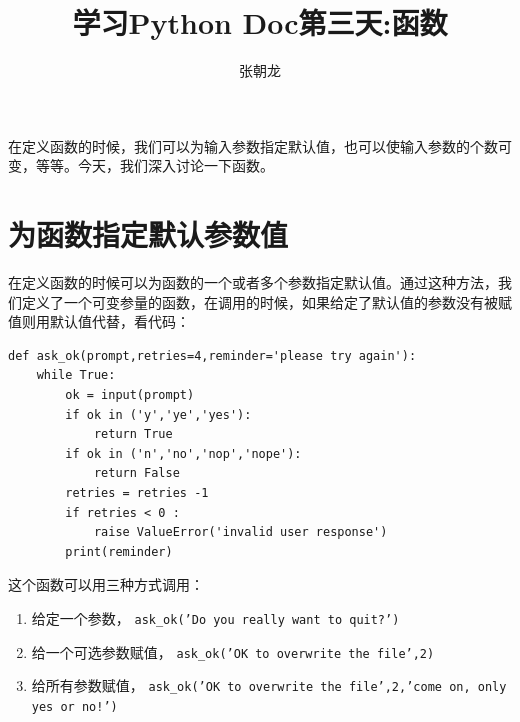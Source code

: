 \documentclass[10pt,a4paper,UTF8]{article}
\author{张朝龙}
\date{}
\title{学习Python Doc第三天:函数}
\begin{document}
\maketitle
\tableofcontents
{}
\newpage

在定义函数的时候，我们可以为输入参数指定默认值，也可以使输入参数的个数可变，等等。今天，我们深入讨论一下函数。

\section{为函数指定默认参数值}
\label{sec:org65cf5f8}


在定义函数的时候可以为函数的一个或者多个参数指定默认值。通过这种方法，我们定义了一个可变参量的函数，在调用的时候，如果给定了默认值的参数没有被赋值则用默认值代替，看代码：
\lstset{language=Python,label= ,caption= ,captionpos=b,firstnumber=1,numbers=left}
\begin{lstlisting}
def ask_ok(prompt,retries=4,reminder='please try again'):
    while True:
        ok = input(prompt)
        if ok in ('y','ye','yes'):
            return True
        if ok in ('n','no','nop','nope'):
            return False
        retries = retries -1
        if retries < 0 :
            raise ValueError('invalid user response')
        print(reminder)
\end{lstlisting}

这个函数可以用三种方式调用：
\begin{enumerate}
\item 给定一个参数， \texttt{ask\_ok('Do you really want to quit?')}
\item 给一个可选参数赋值， \texttt{ask\_ok('OK to overwrite the file',2)}
\item 给所有参数赋值， \texttt{ask\_ok('OK to overwrite the file',2,'come on, only yes or no!')}
\end{enumerate}
\end{document}
